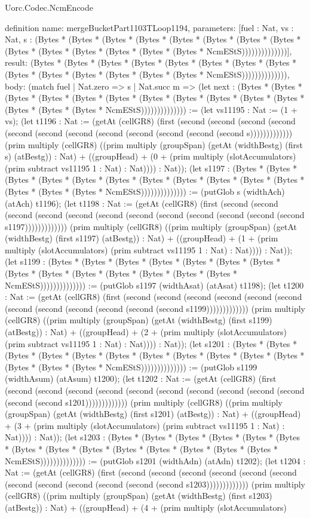 \begin{lexlean}{Uorc.Codec.NcmEncode}
\begin{semanticmodule}
definition{
  name: mergeBucketPart1103TLoop1194,
  parameters: [fuel : Nat, vs : Nat, s : (Bytes * (Bytes * (Bytes * (Bytes * (Bytes * (Bytes * (Bytes * (Bytes * (Bytes * (Bytes * (Bytes * (Bytes * (Bytes * (Bytes * NcmEStS))))))))))))))],
  result: (Bytes * (Bytes * (Bytes * (Bytes * (Bytes * (Bytes * (Bytes * (Bytes * (Bytes * (Bytes * (Bytes * (Bytes * (Bytes * (Bytes * NcmEStS)))))))))))))),
  body: (match fuel
    | Nat.zero => s
    | Nat.succ m => (let next : (Bytes * (Bytes * (Bytes * (Bytes * (Bytes * (Bytes * (Bytes * (Bytes * (Bytes * (Bytes * (Bytes * (Bytes * (Bytes * (Bytes * NcmEStS)))))))))))))) := (let vs11195 : Nat := (1 + vs); (let t1196 : Nat := (getAt (cellGR8) (first (second (second (second (second (second (second (second (second (second (second (second (second s))))))))))))) (prim multiply (cellGR8) ((prim multiply (groupSpan) (getAt (widthBestg) (first s) (atBestg)) : Nat) + ((groupHead) + (0 + (prim multiply (slotAccumulators) (prim subtract vs11195 1 : Nat) : Nat)))) : Nat)); (let s1197 : (Bytes * (Bytes * (Bytes * (Bytes * (Bytes * (Bytes * (Bytes * (Bytes * (Bytes * (Bytes * (Bytes * (Bytes * (Bytes * (Bytes * NcmEStS)))))))))))))) := (putGlob s (widthAch) (atAch) t1196); (let t1198 : Nat := (getAt (cellGR8) (first (second (second (second (second (second (second (second (second (second (second (second (second s1197))))))))))))) (prim multiply (cellGR8) ((prim multiply (groupSpan) (getAt (widthBestg) (first s1197) (atBestg)) : Nat) + ((groupHead) + (1 + (prim multiply (slotAccumulators) (prim subtract vs11195 1 : Nat) : Nat)))) : Nat)); (let s1199 : (Bytes * (Bytes * (Bytes * (Bytes * (Bytes * (Bytes * (Bytes * (Bytes * (Bytes * (Bytes * (Bytes * (Bytes * (Bytes * (Bytes * NcmEStS)))))))))))))) := (putGlob s1197 (widthAsat) (atAsat) t1198); (let t1200 : Nat := (getAt (cellGR8) (first (second (second (second (second (second (second (second (second (second (second (second (second s1199))))))))))))) (prim multiply (cellGR8) ((prim multiply (groupSpan) (getAt (widthBestg) (first s1199) (atBestg)) : Nat) + ((groupHead) + (2 + (prim multiply (slotAccumulators) (prim subtract vs11195 1 : Nat) : Nat)))) : Nat)); (let s1201 : (Bytes * (Bytes * (Bytes * (Bytes * (Bytes * (Bytes * (Bytes * (Bytes * (Bytes * (Bytes * (Bytes * (Bytes * (Bytes * (Bytes * NcmEStS)))))))))))))) := (putGlob s1199 (widthAsum) (atAsum) t1200); (let t1202 : Nat := (getAt (cellGR8) (first (second (second (second (second (second (second (second (second (second (second (second (second s1201))))))))))))) (prim multiply (cellGR8) ((prim multiply (groupSpan) (getAt (widthBestg) (first s1201) (atBestg)) : Nat) + ((groupHead) + (3 + (prim multiply (slotAccumulators) (prim subtract vs11195 1 : Nat) : Nat)))) : Nat)); (let s1203 : (Bytes * (Bytes * (Bytes * (Bytes * (Bytes * (Bytes * (Bytes * (Bytes * (Bytes * (Bytes * (Bytes * (Bytes * (Bytes * (Bytes * NcmEStS)))))))))))))) := (putGlob s1201 (widthAdn) (atAdn) t1202); (let t1204 : Nat := (getAt (cellGR8) (first (second (second (second (second (second (second (second (second (second (second (second (second s1203))))))))))))) (prim multiply (cellGR8) ((prim multiply (groupSpan) (getAt (widthBestg) (first s1203) (atBestg)) : Nat) + ((groupHead) + (4 + (prim multiply (slotAccumulators) }
\end{semanticmodule}
\end{lexlean}
